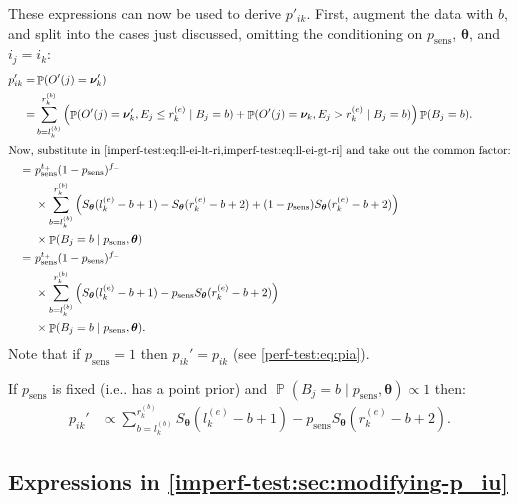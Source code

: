 \documentclass[12pt]{article}
\makeatletter
\DeclareMathOperator{\prob}{\mathbb{P}}
\renewcommand{\vec}[1]{\bm{#1}}
\newcommand{\psens}{p_\text{sens}}
\DeclareRobustCommand\onedot{\futurelet\@let@token\@onedot}
\def\@onedot{\ifx\@let@token.\else.\null\fi\xspace}
\def\ie{i.e\onedot} \def\Ie{{I.e}\onedot}
\makeatother
\begin{document}
These expressions can now be used to derive $p'_{ik}$.
First, augment the data with $b$, and split into the cases just discussed, omitting the conditioning on $\psens$, $\vec{\theta}$, and $i_j = i_k$:
\begin{align}
p_{ik}'
=& \prob(O'(j) = \vec{\nu}_k') \\
=& \sum_{b = l_k^{(b)}}^{r_k^{(b)}} \left( \prob(O'(j) = \vec{\nu}_k', E_j \leq r_k^{(e)} \mid B_j = b) + \prob(O'(j) = \vec{\nu}_k, E_j > r_k^{(e)} \mid B_j = b) \right) \prob(B_j = b). \\
\intertext{Now, substitute in \cref{imperf-test:eq:ll-ei-lt-ri,imperf-test:eq:ll-ei-gt-ri} and take out the common factor:}
=\ &  p_\text{sens}^{t_+} (1 - p_\text{sens})^{f_-} \\
 & \times \sum_{b = l_k^{(b)}}^{r_k^{(b)}} \left( S_{\vec{\theta}}(l_k^{(e)} - b + 1) - S_{\vec{\theta}}(r_k^{(e)} - b + 2) + (1 - p_\text{sens}) S_{\vec{\theta}}(r_k^{(e)} - b + 2) \right) \\ 
  & \times \prob(B_j = b \mid p_\text{sens}, \vec{\theta}) \\
=\ &  p_\text{sens}^{t_+} (1 - p_\text{sens})^{f_-} \\
  & \times \sum_{b = l_k^{(b)}}^{r_k^{(b)}} \left( S_{\vec{\theta}}(l_k^{(e)} - b + 1) - p_\text{sens} S_{\vec{\theta}}(r_k^{(e)} - b + 2) \right) \\
  & \times \prob(B_j = b \mid p_\text{sens}, \vec{\theta}).
\label{imperf-test:eq:pia-prime}
\end{align}
Note that if $p_\text{sens} = 1$ then $p_{ik}' = p_{ik}$ (see \cref{perf-test:eq:pia}).

If $\psens$ is fixed (\ie has a point prior) and $\prob(B_j = b \mid \psens, \vec{\theta}) \propto 1$ then:
\begin{align}
p_{ik}'
&\propto \sum_{b = l_k^{(b)}}^{r_k^{(b)}} S_{\vec{\theta}}(l_k^{(e)} - b + 1) - p_\text{sens} S_{\vec{\theta}}(r_k^{(e)} - b + 2).
\label{imperf-test:eq:pia-prime-constant}
\end{align}

\subsection{Expressions in \cref{imperf-test:sec:modifying-p_iu}} \label{sec:p-iu-dash}
\end{document}
